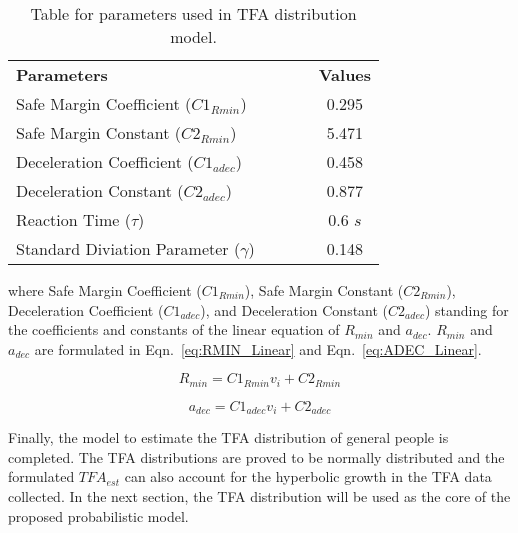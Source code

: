 \begin{table}[htbp]
\caption{Table for parameters used in TFA distribution model.}
\begin{center}
\label{table:parameters}
\begin{tabular}{l l l l c}
& & \\ %
\hline
\textbf{Parameters} &  & & &\textbf{Values} \\
\hline
Safe Margin Coefficient (${C1}_{Rmin}$)     &  &  & &  0.295  \\
Safe Margin Constant (${C2}_{Rmin}$)     &  &  & &  5.471  \\
Deceleration Coefficient (${C1}_{adec}$) &  &  & & 0.458  \\
Deceleration Constant (${C2}_{adec}$) &  &  & & 0.877  \\
Reaction Time ($\tau$)        &  &  & & 0.6 $s$ \\
Standard Diviation Parameter ($\gamma$)      &  &  & & 0.148  \\
\hline
\end{tabular}
\end{center}
\end{table}

\noindent where Safe Margin Coefficient (${C1}_{Rmin}$), Safe Margin Constant (${C2}_{Rmin}$), Deceleration Coefficient (${C1}_{adec}$), and Deceleration Constant (${C2}_{adec}$) standing for the coefficients and constants of the linear equation of $R_{min}$ and $a_{dec}$. $R_{min}$ and $a_{dec}$ are formulated in Eqn.~\ref{eq:RMIN_Linear} and Eqn.~\ref{eq:ADEC_Linear}.

\begin{equation}
R_{min} = {C1}_{Rmin} v_i + {C2}_{Rmin}
\label{eq:RMIN_Linear}
\end{equation}

\begin{equation}
a_{dec} = {C1}_{adec} v_i + {C2}_{adec}
\label{eq:ADEC_Linear}
\end{equation}

Finally, the model to estimate the TFA distribution of general people is completed. The TFA distributions are proved to be normally distributed and the formulated $TFA_{est}$ can also account for the hyperbolic growth in the TFA data collected. In the next section, the TFA distribution will be used as the core of the proposed probabilistic model.

